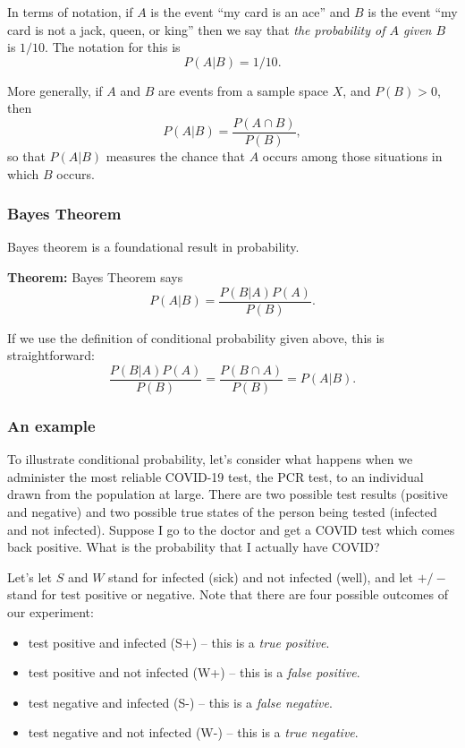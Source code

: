 \documentclass[
]{article}
\providecommand{\tightlist}{%
  \setlength{\itemsep}{0pt}\setlength{\parskip}{0pt}}
\begin{document}
In terms of notation, if \(A\) is the event ``my card is an ace'' and
\(B\) is the event ``my card is not a jack, queen, or king'' then we say
that \emph{the probability of \(A\) given \(B\)} is \(1/10\). The
notation for this is \[
P(A|B) = 1/10.
\]

More generally, if \(A\) and \(B\) are events from a sample space \(X\),
and \(P(B)>0\), then \[
P(A|B) = \frac{P(A\cap B)}{P(B)},
\] so that \(P(A|B)\) measures the chance that \(A\) occurs among those
situations in which \(B\) occurs.

\hypertarget{bayes-theorem}{%
\subsubsection{Bayes Theorem}\label{bayes-theorem}}

Bayes theorem is a foundational result in probability.

\textbf{Theorem:} Bayes Theorem says \[
P(A|B) = \frac{P(B|A)P(A)}{P(B)}.
\]

If we use the definition of conditional probability given above, this is
straightforward: \[
\frac{P(B|A)P(A)}{P(B)} = \frac{P(B\cap A)}{P(B)} = P(A|B).
\]

\hypertarget{an-example}{%
\subsubsection{An example}\label{an-example}}

To illustrate conditional probability, let's consider what happens when
we administer the most reliable COVID-19 test, the PCR test, to an
individual drawn from the population at large. There are two possible
test results (positive and negative) and two possible true states of the
person being tested (infected and not infected). Suppose I go to the
doctor and get a COVID test which comes back positive. What is the
probability that I actually have COVID?

Let's let \(S\) and \(W\) stand for infected (sick) and not infected
(well), and let \(+/-\) stand for test positive or negative. Note that
there are four possible outcomes of our experiment:

\begin{itemize}
\tightlist
\item
  test positive and infected (S+) -- this is a \emph{true positive}.
\item
  test positive and not infected (W+) -- this is a \emph{false
  positive}.
\item
  test negative and infected (S-) -- this is a \emph{false negative}.
\item
  test negative and not infected (W-) -- this is a \emph{true negative}.
\end{itemize}
\end{document}
